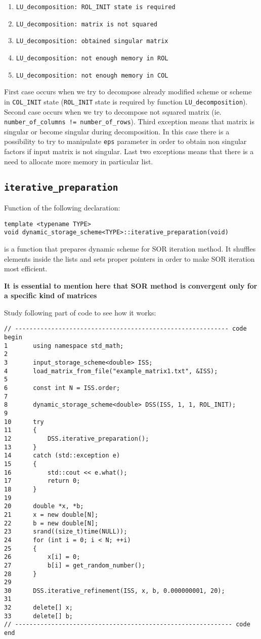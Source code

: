 \begin{enumerate}
	\item \texttt{LU\_decomposition: ROL\_INIT state is required}
	\item \texttt{LU\_decomposition: matrix is not squared}
	\item \texttt{LU\_decomposition: obtained singular matrix}
	\item \texttt{LU\_decomposition: not enough memory in ROL}
	\item \texttt{LU\_decomposition: not enough memory in COL}
\end{enumerate}

\noindent First case occurs when we try to decompose already modified scheme or scheme in \texttt{COL\_INIT} state (\texttt{ROL\_INIT} state is required by function \texttt{LU\_decomposition}). Second case occurs when we try to decompose not squared matrix (ie. \texttt{number\_of\_columns != number\_of\_rows}). Third exception means that matrix is singular or become singular during decomposition. In this case there is a possibility to try to manipulate \texttt{eps} parameter in order to obtain non singular factors if input matrix is not singular. Last two exceptions means that there is a need to allocate more memory in particular list.

\subsection{\texttt{iterative\_preparation}}
Function of the following declaration:
\begin{verbatim}
template <typename TYPE>
void dynamic_storage_scheme<TYPE>::iterative_preparation(void)
\end{verbatim}
is a function that prepares dynamic scheme for SOR iteration method.
It shuffles elements inside the lists and sets proper pointers in order to make SOR iteration most efficient.

\begin{center}
\textbf{It is essential to mention here that SOR method is convergent only for a specific kind of matrices}
\end{center}

Study following part of code to see how it works:
\begin{verbatim}
// ----------------------------------------------------------- code begin
1       using namespace std_math;
2
3       input_storage_scheme<double> ISS;
4       load_matrix_from_file("example_matrix1.txt", &ISS);
5
6       const int N = ISS.order;
7
8       dynamic_storage_scheme<double> DSS(ISS, 1, 1, ROL_INIT);
9
10      try
11      {
12          DSS.iterative_preparation();
13      }
14      catch (std::exception e)
15      {
16          std::cout << e.what();
17          return 0;
18      }
19
20      double *x, *b;
21      x = new double[N];
22      b = new double[N];
23      srand((size_t)time(NULL));
24      for (int i = 0; i < N; ++i)
25      {
26          x[i] = 0;
27          b[i] = get_random_number();
28      }
29
30      DSS.iterative_refinement(ISS, x, b, 0.000000001, 20);
31
32      delete[] x;
33      delete[] b;
// ------------------------------------------------------------ code end
\end{verbatim}

